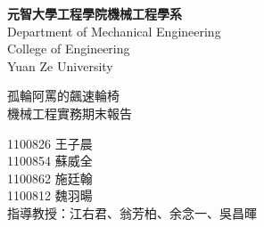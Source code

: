 \documentclass[12pt]{article}       %
\begin{document}
\begin{titlepage}
    \centering
    \vspace*{1cm} %

    {\LARGE \textbf{元智大學工程學院機械工程學系}} \\[0.5cm] %
    {\LARGE {Department of Mechanical Engineering}} \\[0.5cm] %
    {\LARGE {College of Engineering}} \\[0.5cm]
    {\LARGE {Yuan Ze University}}

    \vfill %

    {\LARGE{孤輪阿罵的飆速輪椅}} \\[0.5cm]%
    {\LARGE{機械工程實務期末報告}} %

    \vfill %

    {\LARGE {1100826 王子晨}}\\[0.5cm]
    {\LARGE {1100854 蘇威全}}\\[0.5cm]
    {\LARGE {1100862 施廷翰}}\\[0.5cm]
    {\LARGE {1100812 魏羽暘}}\\[2.0cm]
    {\LARGE {指導教授：江右君、翁芳柏、余念一、吳昌暉}}\\[0.5cm]

\end{titlepage}
\newpage

\setcounter{page}{1}  %





\end{document}
